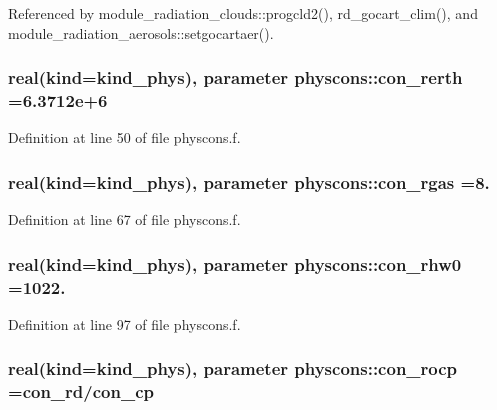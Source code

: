 Referenced by module\+\_\+radiation\+\_\+clouds\+::progcld2(), rd\+\_\+gocart\+\_\+clim(), and module\+\_\+radiation\+\_\+aerosols\+::setgocartaer().

\subsubsection[{\texorpdfstring{con\+\_\+rerth}{con_rerth}}]{\setlength{\rightskip}{0pt plus 5cm}real(kind=kind\+\_\+phys), parameter physcons\+::con\+\_\+rerth =6.\+3712e+6}\hypertarget{namespacephyscons_a45809304b133b2581328b19b36dd47bc}{}\label{namespacephyscons_a45809304b133b2581328b19b36dd47bc}


Definition at line 50 of file physcons.\+f.

\subsubsection[{\texorpdfstring{con\+\_\+rgas}{con_rgas}}]{\setlength{\rightskip}{0pt plus 5cm}real(kind=kind\+\_\+phys), parameter physcons\+::con\+\_\+rgas =8.}\hypertarget{namespacephyscons_ab693404d71b608617bcb6efe24cb57c6}{}\label{namespacephyscons_ab693404d71b608617bcb6efe24cb57c6}


Definition at line 67 of file physcons.\+f.

\subsubsection[{\texorpdfstring{con\+\_\+rhw0}{con_rhw0}}]{\setlength{\rightskip}{0pt plus 5cm}real(kind=kind\+\_\+phys), parameter physcons\+::con\+\_\+rhw0 =1022.}\hypertarget{namespacephyscons_ae553a2a2cea3086dd27d8f88a56d66e1}{}\label{namespacephyscons_ae553a2a2cea3086dd27d8f88a56d66e1}


Definition at line 97 of file physcons.\+f.

\subsubsection[{\texorpdfstring{con\+\_\+rocp}{con_rocp}}]{\setlength{\rightskip}{0pt plus 5cm}real(kind=kind\+\_\+phys), parameter physcons\+::con\+\_\+rocp ={\bf con\+\_\+rd}/{\bf con\+\_\+cp}}\hypertarget{namespacephyscons_a72b27573c69ec418b67763d35b3688a1}{}\label{namespacephyscons_a72b27573c69ec418b67763d35b3688a1}


